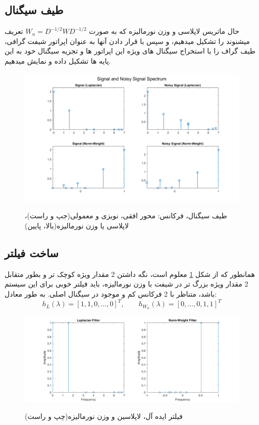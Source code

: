 \subsection{طیف سیگنال}

حال ماتریس لاپلاسی و وزن نورمالیزه که به صورت $W_n=D^{-1/2}WD^{-1/2}$ تعریف میشنوند را تشکیل میدهیم، و سپس
با قرار دادن آنها به عنوان اپراتور شیفت گرافی، طیف گراف را با استخراج سیگنال های ویژه این اپراتور ها و
تجزیه سیگنال خود به این پایه ها تشکیل داده و نمایش میدهیم.

\begin{figure}[h!]
	\centering
	\includegraphics*[width=0.9\linewidth]{../results/Q1/signal_spectra.png}
	\vspace*{-2em}
	\label{fig:sig_spectra}
	\caption{
		طیف سیگنال، فرکانس: محور افقی، نویزی و معمولی(جپ و راست)، لاپلاسی یا وزن نورمالیزه(بالا، پایین)
	}
\end{figure}

\subsection{ساخت فیلتر}

همانطور که از شکل \ref*{fig:sig_spectra} معلوم است، نگه داشتن 2 مقدار ویژه کوچک تر و بطور متقابل 2
مقدار ویژه بزرگ تر در شیفت با وزن نورمالیزه، باید فیلتر خوبی برای این سیستم باشد، متناظر با 2 فرکانس کم و موجود در سیگنال اصلی. به طور معادل:
\[
	h_L(\lambda)=\left[1,1,0,\dots,0\right]^T,\qquad h_{W_n}(\lambda)=\left[0,\dots,0,1,1\right]^T
\]

\begin{figure}[h!]
	\centering
	\includegraphics*[width=0.9\linewidth]{../results/Q1/ideal_filt.png}
	\vspace*{-1em}
	\label{fig:ideal_filt}
	\caption{
		فیلتر ایده آل، لاپلاسین و وزن نورمالیزه(چپ و راست)
	}
\end{figure}

